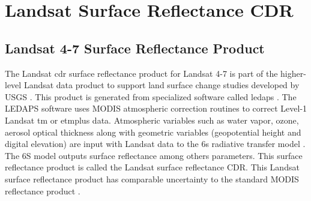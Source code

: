 

\section{Landsat Surface Reflectance CDR}
\label{sec:CDR} 
\subsection{Landsat 4-7 Surface Reflectance Product}
The Landsat \gls{cdr} surface reflectance product for Landsat 4-7 is part of the higher-level Landsat data product to support land surface change studies developed by USGS \citep{LandsatCDR}. This product is generated from specialized software called \gls{ledaps} \citep{Masek:2006}. The LEDAPS software uses MODIS atmospheric correction routines to correct Level-1 Landsat \gls{tm} or \gls{etmplus} data. Atmospheric variables such as water vapor, ozone, aerosol optical thickness along with geometric variables (geopotential height and digital elevation) are input with Landsat data to the \gls{6s} radiative transfer model \citep{Vermote1997_6S}. The 6S model outputs surface reflectance among others parameters. This surface reflectance product is called the Landsat surface reflectance CDR. This Landsat surface reflectance product has comparable uncertainty to the standard MODIS reflectance product \citep{Masek:2006}.

